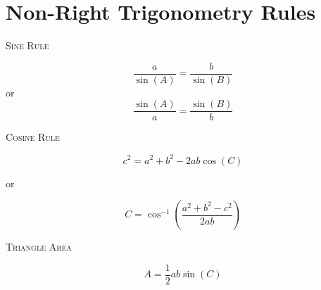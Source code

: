 \documentclass[a4paper, 12pt]{article}
\begin{document}
\section*{Non-Right Trigonometry Rules}
\LARGE

\textsc{Sine Rule}

$$\frac{a}{\sin(A)} = \frac{b}{\sin(B)}$$
or
$$\frac{\sin(A)}{a} = \frac{\sin(B)}{b}$$

\textsc{Cosine Rule}

$$c^2 = a^2 + b^2 - 2ab\cos(C)$$

or

$$C = \cos^{-1}\left(\frac{a^2 + b^2 - c^2}{2ab}\right)$$

\textsc{Triangle Area}

$$A = \frac{1}{2}ab\sin(C)$$

\normalsize
\end{document}
